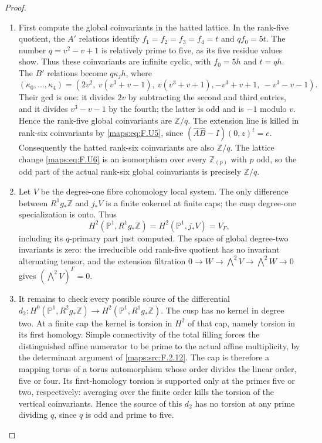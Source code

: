 \begin{proof}
\begin{enumerate}[label=\arabic*.]
\item First compute the global coinvariants in the hatted lattice.
In the rank-five quotient, the $A'$ relations identify
$f_1=f_2=f_3=f_4=t$ and $qf_0=5t$.
The number $q=v^2-v+1$ is relatively prime to five, as its
five residue values show.  Thus these coinvariants are
infinite cyclic, with $f_0=5h$ and $t=qh$.
The $B'$ relations become $q\kappa_j h$, where
\[
 (\kappa_0,\ldots,\kappa_4)=
 (2v^2,\ v(v^3+v-1),\ v(v^3+v+1),
       -v^3+v+1,\ -v^3-v-1).
 \tag{F.U10}\label{maps:eq:F.U10}
\]
Their gcd is one: it divides $2v$ by subtracting the second
and third entries, and it divides $v^3-v-1$ by the fourth;
the latter is odd and is $-1$ modulo $v$.
Hence the rank-five global coinvariants are $\mathbb Z/q$.
The extension line is killed in rank-six coinvariants by
\eqref{maps:eq:F.U5}, since
$(\widehat A\widehat B-I)(0,z)^t=e$.
Consequently the hatted rank-six coinvariants are also
$\mathbb Z/q$.  The lattice change \eqref{maps:eq:F.U6} is an isomorphism
over every $\mathbb Z_{(p)}$ with $p$ odd, so the odd part of
the actual rank-six global coinvariants is precisely
$\mathbb Z/q$.

\item Let $V$ be the degree-one fibre cohomology local system.
The only difference between $R^1g_*\mathbb Z$ and $j_*V$
is a finite cokernel at finite caps; the cusp degree-one
specialization is onto.  Thus
\[
 H^2(\mathbb P^1,R^1g_*\mathbb Z)
 =H^2(\mathbb P^1,j_*V)=V_\Gamma,
\]
including its $q$-primary part just computed.  The space of
global degree-two invariants is zero: the irreducible odd
rank-five quotient has no invariant alternating tensor,
and the extension filtration
$0\to W\to\bigwedge^2V\to\bigwedge^2W\to0$
gives $(\bigwedge^2V)^\Gamma=0$.

\item It remains to check every possible source of the differential
$d_2:H^0(\mathbb P^1,R^2g_*\mathbb Z)
\to H^2(\mathbb P^1,R^1g_*\mathbb Z)$.
The cusp has no kernel in degree two.  At a finite cap the
kernel is torsion in $H^2$ of that cap, namely torsion in its
first homology.  Simple connectivity of the total filling
forces the distinguished affine numerator to be prime to the
actual affine multiplicity, by the determinant argument of
\ref{maps:src:F.2.12}.  The cap is therefore a mapping torus of a torus
automorphism whose order divides the linear order, five or
four.  Its first-homology torsion is supported only at the
primes five or two, respectively: averaging over the finite
order kills the torsion of the vertical coinvariants.
Hence the source of this $d_2$ has no torsion at any prime
dividing $q$, since $q$ is odd and prime to five.


\end{enumerate}
\end{proof}
